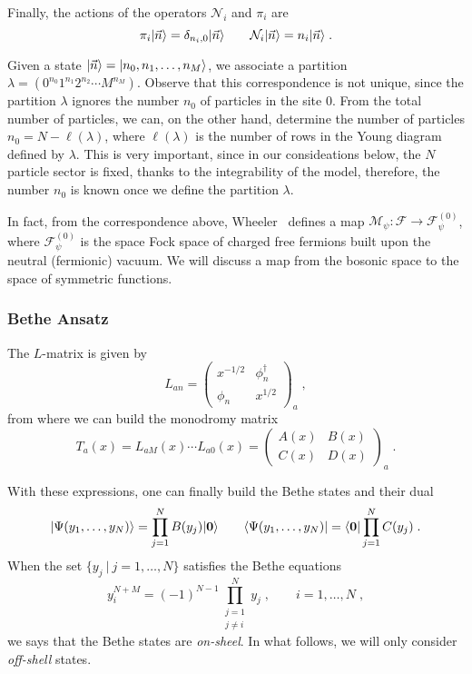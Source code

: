 \documentclass[a4paper,11pt]{amsart}
\begin{document}
Finally, the actions of the operators \(\mathcal{N}_i\) and \(\pi_i\) are
\begin{equation}
    \pi_i\lvert\vec{n}\rangle  = \delta_{n_i, 0} \lvert\vec{n}\rangle \qquad 
    \mathcal{N}_i\lvert\vec{n}\rangle = n_i \lvert\vec{n}\rangle\; .
\end{equation}
 
Given a state \(\lvert\vec{n}\rangle = \lvert n_0, n_1, \dots, n_M\rangle\), we
associate a partition \( \lambda = (0^{n_0} 1^{n_1} 2^{n_2} \cdots
M^{n_M})\). Observe that this correspondence is not unique, since the
partition \(\lambda\) ignores the number \(n_0\) of particles in the
site \(0\). From the total number of particles, we can, on the other hand,
determine the number of particles \(n_0 = N - \ell(\lambda)\), where
\(\ell(\lambda)\) is the number of rows in the Young diagram defined
by \(\lambda\). This is very important, since in our consideations 
below, the \(N\) particle sector is fixed, thanks to the integrability of 
the model, therefore, the number \(n_0\) is known once we define the 
partition \(\lambda\). 

In fact, from the correspondence above, Wheeler~\cite{Wheeler:2010vmq}
defines a map \(\mathcal{M}_\psi: \mathcal{F}\to
\mathcal{F}^{(0)}_\psi\), where \(\mathcal{F}^{(0)}_\psi\) is the
space Fock space of charged free fermions built upon the neutral
(fermionic) vacuum. We will discuss a map from the bosonic space to
the space of symmetric functions.

\subsubsection{Bethe Ansatz}
The \(L\)-matrix is given by 
\begin{equation}
  L_{an} = 
\begin{pmatrix}
x^{ - 1/2} & \phi_n^\dagger \\ \phi_n & x^{1/2}
\end{pmatrix}_a\; , 
\end{equation}
from where we can build the monodromy matrix 
\begin{equation}
  T_a(x) = L_{aM}(x) \cdots L_{a0}(x) = 
\begin{pmatrix}
A(x) & B(x) \\ C(x) & D(x)
\end{pmatrix}_a\; .
\end{equation}

With these expressions, one can finally build the Bethe states and their dual 
\begin{equation}
  \lvert\Psi(y_1, \dots, y_N)\rangle = \prod_{j=1}^N B(y_j) \lvert\bm{0}\rangle\qquad 
  \langle\Psi(y_1, \dots, y_N)\rvert = \langle\bm{0}\rvert\prod_{j=1}^N C(y_j) \; .
\end{equation}
When the set \(\{ y_j \ | \ j =1, \dots , N\}\) satisfies the Bethe equations 
\begin{equation}
  y^{N + M}_i = (-1)^{N-1} \prod_{\substack{j = 1 \\ j \neq i}}^N y_j\; , \qquad i = 1, \dots, N\; , 
\end{equation}
we says that the Bethe states are \emph{on-sheel}. In what follows, we will 
only consider \emph{off-shell} states. 
\end{document}

